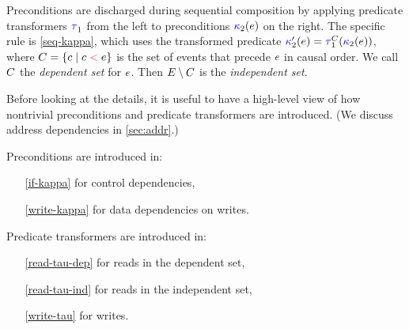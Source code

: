 Preconditions are discharged during sequential composition by applying
predicate transformers $\aTr[1]{}{}$ from the left to preconditions
${\color{blue}\kappa}_2(e)$ on the right.  The specific rule is
\ref{seq-kappa},
which uses the transformed predicate
$\labelingForm'_2(\aEv)=\aTr[1]{\Cdown{\aEv}}{\labelingForm_2(\aEv})$, where
$C=\{ c \mid c \mathrel{{\color{magenta}<}} e \}$ is the set of events that
precede $e$ in causal order.  We call $C$ the \emph{dependent
  set} for $e$.  Then $E\setminus C$ is the
\emph{independent set}. %



Before looking at the details, it is useful to have a high-level view of how
nontrivial preconditions and predicate transformers are introduced.  (We
discuss address dependencies in \textsection\ref{sec:addr}.)
\begin{multicols}{2}
  Preconditions are introduced in: 
  \begin{itemize}
  \item[\eqref{if-kappa}] for control dependencies, 
  \item[\eqref{write-kappa}] for data dependencies on writes.
  \item[] 
  \end{itemize}
  \columnbreak

  Predicate transformers are introduced in:
  \begin{itemize}
  \item[\eqref{read-tau-dep}] for reads in the dependent set,
  \item[\eqref{read-tau-ind}] for reads in the independent set,
  \item[\eqref{write-tau}] for writes.
  \end{itemize}
\end{multicols}


